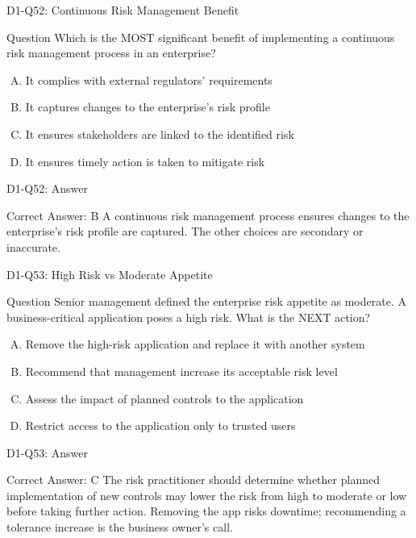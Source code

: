 \documentclass{beamer}
\begin{document}
	\begin{frame}{D1-Q52: Continuous Risk Management Benefit}
		\begin{block}{Question}
			Which is the MOST significant benefit of implementing a continuous risk management process in an enterprise?
		\end{block}
		\begin{enumerate}[(A)]
			\item It complies with external regulators' requirements
			\item It captures changes to the enterprise's risk profile
			\item It ensures stakeholders are linked to the identified risk
			\item It ensures timely action is taken to mitigate risk
		\end{enumerate}
	\end{frame}
	\begin{frame}{D1-Q52: Answer}
		\begin{block}{Correct Answer: B}
			A continuous risk management process ensures changes to the enterprise's risk profile are captured. The other choices are secondary or inaccurate.
		\end{block}
	\end{frame}
	
	\begin{frame}{D1-Q53: High Risk vs Moderate Appetite}
		\begin{block}{Question}
			Senior management defined the enterprise risk appetite as moderate. A business-critical application poses a high risk. What is the NEXT action?
		\end{block}
		\begin{enumerate}[(A)]
			\item Remove the high-risk application and replace it with another system
			\item Recommend that management increase its acceptable risk level
			\item Assess the impact of planned controls to the application
			\item Restrict access to the application only to trusted users
		\end{enumerate}
	\end{frame}
	\begin{frame}{D1-Q53: Answer}
		\begin{block}{Correct Answer: C}
			The risk practitioner should determine whether planned implementation of new controls may lower the risk from high to moderate or low before taking further action. Removing the app risks downtime; recommending a tolerance increase is the business owner's call.
		\end{block}
	\end{frame}
	
\end{document}
